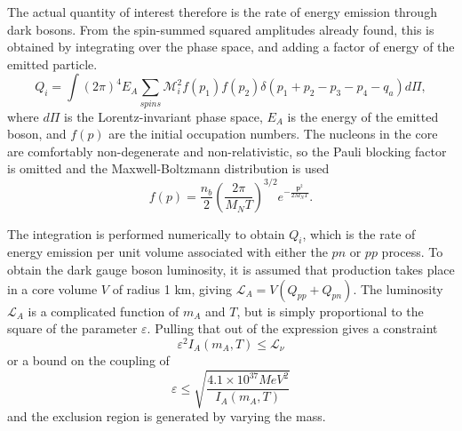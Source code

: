 \documentclass[nofootinbib,prd,superscriptaddress,twocolumn]{revtex4}
\newcommand{\beq}{\begin{equation}}
\newcommand{\eeq}{\end{equation}}
\begin{document}
The actual quantity of interest therefore is the rate of energy emission through dark bosons. From the spin-summed squared amplitudes already found, this is obtained by integrating over the phase space, and adding a factor of energy of the emitted particle.
\beq
Q_i = \int (2\pi)^4 E_A \sum_{spins} \mathcal{M}^2_i f(p_1) f(p_2)\delta(p_1+p_2-p_3-p_4-q_a) d\Pi,
\eeq
where $d\Pi$ is the Lorentz-invariant phase space, $ E_A $ is the energy of the emitted boson, and $ f(p) $ are the initial occupation numbers. The nucleons in the core are comfortably non-degenerate and non-relativistic, so  the Pauli blocking factor is omitted and the Maxwell-Boltzmann distribution is used  
\beq
f(p) =  \frac{n_b}{2} (\frac{2 \pi}{M_N T})^{3/2} e^{-\frac{\textbf{p}^2} {2 M_N T}}.
\eeq
	
The integration is performed numerically to obtain $ Q_i$, which is the rate of energy emission per unit volume associated with either the $pn$ or $pp$ process. To obtain the dark gauge boson luminosity, it is assumed that production takes place in a core volume $V$ of radius 1 km, giving $ \mathcal{L}_A = V(Q_{pp} + Q_{pn}) $. The luminosity $\mathcal{L}_A $ is a complicated function of $ m_A $ and $ T $, but is simply proportional to the square of the parameter $ \varepsilon $.  Pulling that out of the expression gives a constraint 
\beq
\varepsilon^2 I_A(m_A, T) \le \mathcal{L}_\nu
\eeq
or a bound on the coupling of 
\beq 
\varepsilon \le \sqrt{\frac{4.1 \times 10^{37} MeV^2}{I_A(m_A, T)}} 
\eeq 
and the exclusion region is generated by varying the mass. 
\end{document}
